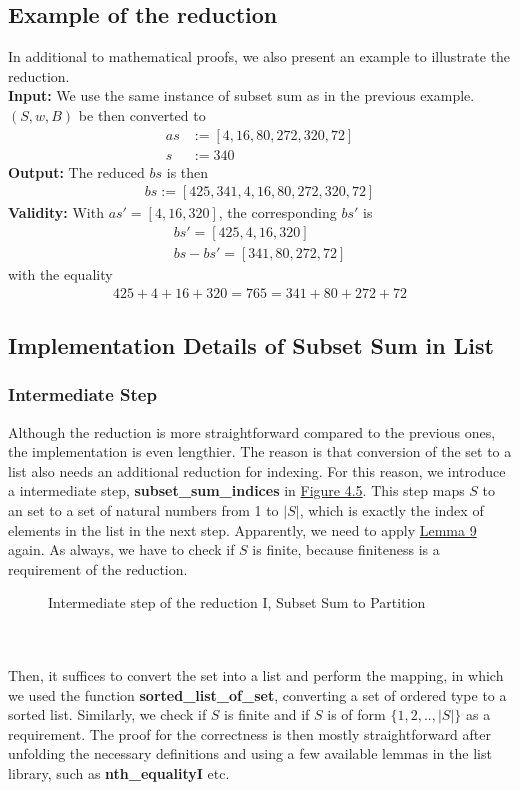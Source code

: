 \subsection{Example of the reduction}
In additional to mathematical proofs, we also present an example to illustrate the reduction.\\
\textbf{Input:} We use the same instance of subset sum as in the previous example. $(S, w, B)$ be 
then converted to 
\begin{align*}
    as &:= [4, 16, 80, 272, 320, 72] \\ 
    s &:= 340
\end{align*}
\textbf{Output:} The reduced $bs$ is then 
\begin{align*}
    bs := [425, 341, 4, 16, 80, 272, 320, 72]
\end{align*}
\textbf{Validity:} With $as' = [4, 16, 320]$, the corresponding $bs'$ is 
\begin{align*}
    bs' = [425, 4, 16, 320] \\ 
    bs - bs' = [341, 80, 272, 72]
\end{align*}
with the equality
\begin{align*}
    425 + 4 + 16 + 320 = 765 = 341 + 80 + 272 + 72 
\end{align*}

\subsection{Implementation Details of Subset Sum in List}
\subsubsection*{Intermediate Step}
Although the reduction is more straightforward compared to the previous ones, the implementation is even lengthier. 
The reason is that conversion of the set to a list also needs an additional reduction for indexing. For this reason, we introduce 
a intermediate step, \textbf{subset\_sum\_indices} in \hyperref[fig:4.5]{Figure 4.5}.
This step maps $S$ to an set to a set of natural numbers from 1 to $|S|$, which is exactly the index of elements 
in the list in the next step. Apparently, we need to apply \hyperref[lemma:9]{Lemma 9} again. 
As always, we have to check if $S$ is finite, because finiteness is a requirement of the reduction.
\begin{figure}[!h]
    \caption{Intermediate step of the reduction I, Subset Sum to Partition}
    \label{fig:4.6}
\end{figure}\\\\
Then, it suffices to convert the set into a list and perform the mapping, in which we used the function 
\textbf{sorted\_list\_of\_set}, converting a set of ordered type to a sorted list. Similarly, we check if 
$S$ is finite and if $S$ is of form $\{1, 2, .. , |S|\}$ as a requirement. The proof for the correctness is then mostly straightforward
after unfolding the necessary definitions and using a few available lemmas in the list library, such as \textbf{nth\_equalityI} etc. 

